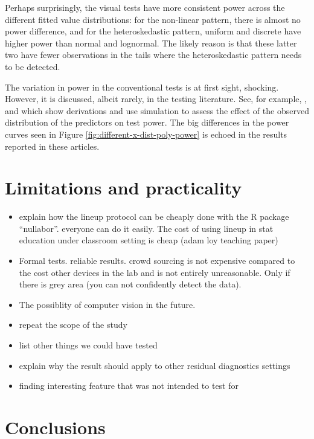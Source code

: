 \documentclass[]{interact}
\theoremstyle{plain}%
\theoremstyle{definition}
\theoremstyle{remark}
\begin{document}
Perhaps surprisingly, the visual tests have more consistent power across
the different fitted value distributions: for the non-linear pattern,
there is almost no power difference, and for the heteroskedastic
pattern, uniform and discrete have higher power than normal and
lognormal. The likely reason is that these latter two have fewer
observations in the tails where the heteroskedastic pattern needs to be
detected.

The variation in power in the conventional tests is at first sight,
shocking. However, it is discussed, albeit rarely, in the testing
literature. See, for example, \citet{jamshidian2007study},
\citet{olvera2019relationship} and \citet{zhang2018practical} which show
derivations and use simulation to assess the effect of the observed
distribution of the predictors on test power. The big differences in the
power curves seen in Figure \ref{fig:different-x-dist-poly-power} is
echoed in the results reported in these articles.

\hypertarget{limitations-and-practicality}{%
\section{Limitations and
practicality}\label{limitations-and-practicality}}

\begin{itemize}
\item
  explain how the lineup protocol can be cheaply done with the R package
  ``nullabor''. everyone can do it easily. The cost of using lineup in
  stat education under classroom setting is cheap (adam loy teaching
  paper)
\item
  Formal tests. reliable results. crowd sourcing is not expensive
  compared to the cost other devices in the lab and is not entirely
  unreasonable. Only if there is grey area (you can not confidently
  detect the data).
\item
  The possiblity of computer vision in the future.
\item
  repeat the scope of the study
\item
  list other things we could have tested
\item
  explain why the result should apply to other residual diagnostics
  settings
\item
  finding interesting feature that was not intended to test for
\end{itemize}

\hypertarget{conclusions}{%
\section{Conclusions}\label{conclusions}}
\end{document}
